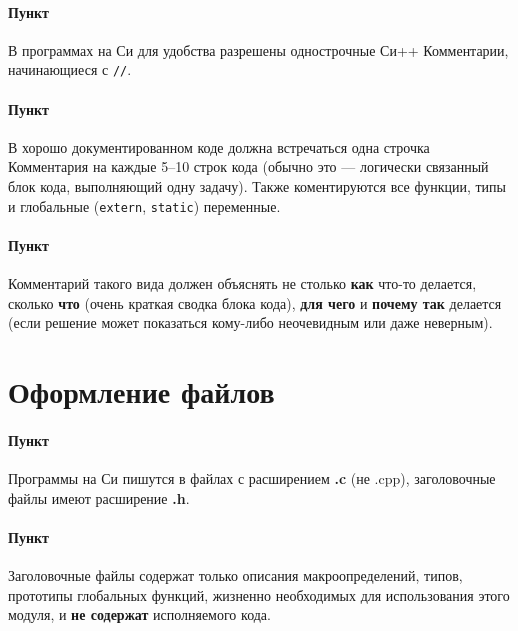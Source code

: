 \paragraph{Пункт}

В программах на Си для удобства разрешены однострочные Си++ Комментарии,
начинающиеся с \texttt{//}.

\paragraph{Пункт}

В хорошо документированном коде должна встречаться одна строчка
Комментария на каждые 5--10 строк кода (обычно это --- логически
связанный блок кода, выполняющий одну задачу). Также коментируются все
функции, типы и глобальные (\texttt{extern}, \texttt{static})
переменные.

\paragraph{Пункт}

Комментарий такого вида должен объяснять не столько \textbf{как} что-то
делается, сколько \textbf{что} (очень краткая сводка блока кода),
\textbf{для чего} и \textbf{почему так} делается (если решение может
показаться кому-либо неочевидным или даже неверным).


\section{Оформление файлов}


\paragraph{Пункт}

Программы на Си пишутся в файлах с расширением \textbf{.c} (не .cpp),
заголовочные файлы имеют расширение \textbf{.h}.

\paragraph{Пункт}

Заголовочные файлы содержат только описания макроопределений, типов,
прототипы глобальных функций, жизненно необходимых для использования
этого модуля, и \textbf{не содержат} исполняемого кода.


